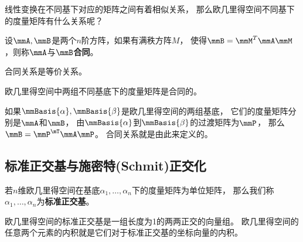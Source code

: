 线性变换在不同基下对应的矩阵之间有着相似关系，
那么欧几里得空间不同基下的度量矩阵有什么关系呢？

\begin{definition}[矩阵的合同]
  设$\mmA,\mmB$是两个$n$阶方阵，如果有满秩方阵$M$，
  使得$\mmB=\mmM^T\mmA\mmM$，则称$\mmA$与$\mmB$\textbf{合同}。
\end{definition}

\begin{remark}
  合同关系是等价关系。
\end{remark}

\begin{theorem}[不同基底下的度量矩阵的关系]
  欧几里得空间中两组不同基底下的度量矩阵是合同的。
\end{theorem}

\begin{remark}
  如果$\mmBasis{\alpha},\mmBasis{\beta}$是欧几里得空间的两组基底，
  它们的度量矩阵分别是$\mmA$和$\mmB$，
  由$\mmBasis{\alpha}$到$\mmBasis{\beta}$的过渡矩阵为$\mmP$，
  那么$\mmB=\mmP^\mT\mmA\mmP$。
  合同关系就是由此来定义的。
\end{remark}

\subsection{标准正交基与施密特(Schmit)正交化}
\begin{definition}[标准正交基]
  若$n$维欧几里得空间在基底$\alpha_1,\dots,\alpha_n$下的度量矩阵为单位矩阵，
  那么我们称$\alpha_1,\dots,\alpha_n$为\textbf{标准正交基}。
\end{definition}

\begin{remark}
  欧几里得空间的标准正交基是一组长度为1的两两正交的向量组。
  欧几里得空间的任意两个元素的内积就是它们对于标准正交基的坐标向量的内积。
\end{remark}


